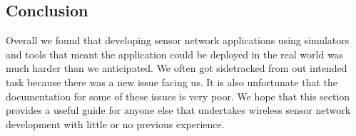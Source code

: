 
\subsection{Conclusion}

Overall we found that developing sensor network applications using simulators and tools that meant the application could be deployed in the real world was much harder than we anticipated. We often got sidetracked from out intended task because there was a new issue facing us. It is also unfortunate that the documentation for some of these issues is very poor. We hope that this section provides a useful guide for anyone else that undertakes wireless sensor network development with little or no previous experience.



